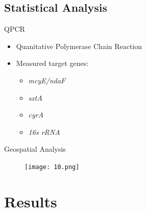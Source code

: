 \subsection{Statistical Analysis}
\begin{frame}{QPCR}
	\begin{itemize}
		\item Quanitative Polymerase Chain Reaction
		\item Measured target genes:
			\begin{itemize}
				\item \emph{mcyE/ndaF}
				\item \emph{sxtA}
				\item \emph{cyrA}
				\item \emph{16s rRNA}
			\end{itemize}
	\end{itemize}
\end{frame}
\begin{frame}{Geospatial Analysis}

	\begin{figure}
		\texttt{[image: 10.png]}
	\end{figure}
\end{frame}
\section{Results}
